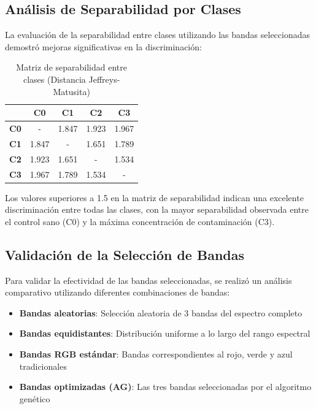 \subsection{Análisis de Separabilidad por Clases}

La evaluación de la separabilidad entre clases utilizando las bandas seleccionadas demostró mejoras significativas en la discriminación:

\begin{table}[h!]
\centering
\caption{Matriz de separabilidad entre clases (Distancia Jeffreys-Matusita)}
\begin{tabular}{|c|c|c|c|c|}
\hline
 & \textbf{C0} & \textbf{C1} & \textbf{C2} & \textbf{C3} \\
\hline
\textbf{C0} & - & 1.847 & 1.923 & 1.967 \\
\hline
\textbf{C1} & 1.847 & - & 1.651 & 1.789 \\
\hline
\textbf{C2} & 1.923 & 1.651 & - & 1.534 \\
\hline
\textbf{C3} & 1.967 & 1.789 & 1.534 & - \\
\hline
\end{tabular}
\label{tab:class_separability}
\end{table}

Los valores superiores a 1.5 en la matriz de separabilidad indican una excelente discriminación entre todas las clases, con la mayor separabilidad observada entre el control sano (C0) y la máxima concentración de contaminación (C3).

\subsection{Validación de la Selección de Bandas}

Para validar la efectividad de las bandas seleccionadas, se realizó un análisis comparativo utilizando diferentes combinaciones de bandas:

\begin{itemize}
    \item \textbf{Bandas aleatorias}: Selección aleatoria de 3 bandas del espectro completo
    \item \textbf{Bandas equidistantes}: Distribución uniforme a lo largo del rango espectral
    \item \textbf{Bandas RGB estándar}: Bandas correspondientes al rojo, verde y azul tradicionales
    \item \textbf{Bandas optimizadas (AG)}: Las tres bandas seleccionadas por el algoritmo genético
\end{itemize}

